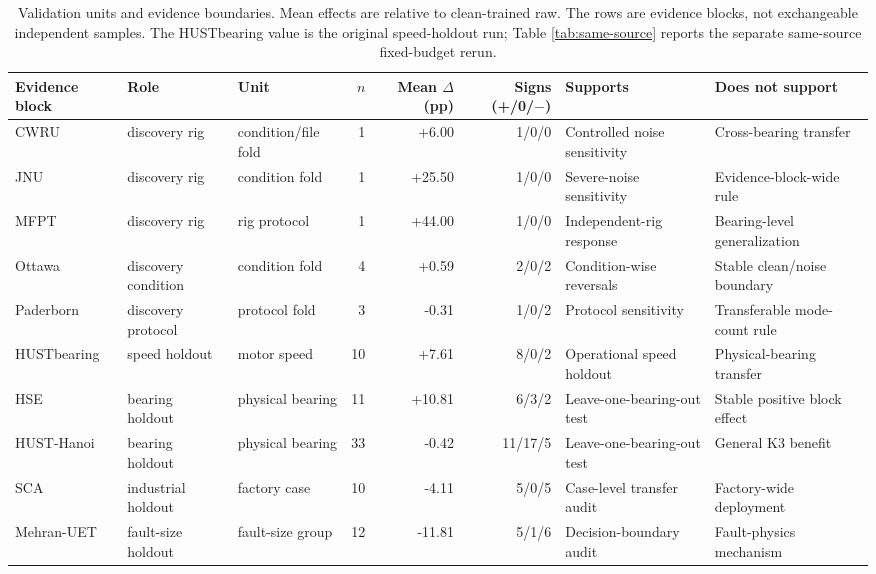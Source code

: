 \documentclass[11pt]{article}
\begin{document}
\begin{table}[t]
\centering
\caption{Validation units and evidence boundaries. Mean effects are relative to
clean-trained raw. The rows are evidence blocks, not exchangeable independent
samples. The HUSTbearing value is the original speed-holdout run; Table
\ref{tab:same-source} reports the separate same-source fixed-budget rerun.}
\label{tab:validation-units}
\scriptsize
\begin{tabularx}{\textwidth}{@{}>{\raggedright\arraybackslash}p{}>{\raggedright\arraybackslash}p{}>{\raggedright\arraybackslash}p{}rrr>{\raggedright\arraybackslash}X>{\raggedright\arraybackslash}X@{}}
\toprule
Evidence block & Role & Unit & $n$ & Mean $\Delta$ (pp) & Signs (+/0/$-$) & Supports & Does not support \\
\midrule
CWRU & discovery rig & condition/file fold & 1 & +6.00 & 1/0/0 & Controlled noise sensitivity & Cross-bearing transfer \\
JNU & discovery rig & condition fold & 1 & +25.50 & 1/0/0 & Severe-noise sensitivity & Evidence-block-wide rule \\
MFPT & discovery rig & rig protocol & 1 & +44.00 & 1/0/0 & Independent-rig response & Bearing-level generalization \\
Ottawa & discovery condition & condition fold & 4 & +0.59 & 2/0/2 & Condition-wise reversals & Stable clean/noise boundary \\
Paderborn & discovery protocol & protocol fold & 3 & -0.31 & 1/0/2 & Protocol sensitivity & Transferable mode-count rule \\
HUSTbearing & speed holdout & motor speed & 10 & +7.61 & 8/0/2 & Operational speed holdout & Physical-bearing transfer \\
HSE & bearing holdout & physical bearing & 11 & +10.81 & 6/3/2 & Leave-one-bearing-out test & Stable positive block effect \\
HUST-Hanoi & bearing holdout & physical bearing & 33 & -0.42 & 11/17/5 & Leave-one-bearing-out test & General K3 benefit \\
SCA & industrial holdout & factory case & 10 & -4.11 & 5/0/5 & Case-level transfer audit & Factory-wide deployment \\
Mehran-UET & fault-size holdout & fault-size group & 12 & -11.81 & 5/1/6 & Decision-boundary audit & Fault-physics mechanism \\
\bottomrule
\end{tabularx}
\end{table}
\end{document}

